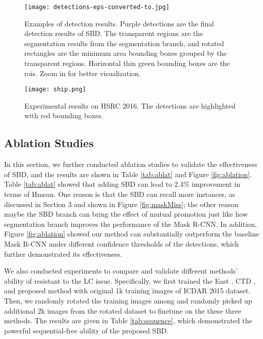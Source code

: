 \documentclass{article}
\begin{document}
\begin{figure}[!t]
  \centering
  \centerline{\texttt{[image: detections-eps-converted-to.jpg]}}
  \caption{Examples of detection results. Purple detections are the final detection results of SBD. The transparent regions are the segmentation results from the segmentation branch, and rotated rectangles are the minimum area bounding boxes grouped by the transparent regions. Horizontal thin green bounding boxes are the rois. Zoom in for better visualization.}\label{fig:dettext}
\end{figure}

\begin{figure}[htb]
  \centering
  \centerline{\texttt{[image: ship.png]}}
  \caption{ Experimental results on HSRC 2016. The detections are highlighted with red bounding boxes. }\label{fig:shipdet}
\end{figure}

\subsection {Ablation Studies}
In this section, we further conducted ablation studies to validate the effectiveness of SBD, and the results are shown in Table \ref{tab:ablat} and Figure \ref{fig:ablation}. Table \ref{tab:ablat} showed that adding SBD can lead to 2.4\% improvement in terms of Hmean. One reason is that the SBD can recall more instances, as discussed in Section 3 and shown in Figure \ref{fig:maskMiss}; the other reason maybe the SBD branch can bring the effect of mutual promotion just like how segmentation branch improves the performance of the Mask R-CNN. In addition, Figure \ref{fig:ablation} showed our method can substantially outperform the baseline Mask R-CNN under different confidence thresholds of the detections, which further demonstrated its effectiveness.

We also conducted experiments to compare and validate different methods' ability of resistant to the LC issue. Specifically, we first trained the East \cite{zhou2017east}, CTD \cite{yuliang2017detecting}, and proposed method with original 1k training images of ICDAR 2015 dataset. Then, we randomly rotated the training images among  and randomly picked up additional 2k images from the rotated dataset to finetune on the these three methods. The results are given in Table \ref{tab:sequence}, which demonstrated the powerful sequential-free ability of the proposed SBD.
\end{document}
